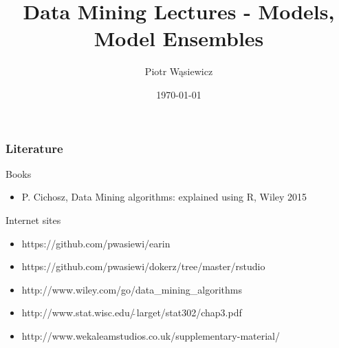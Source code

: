 \documentclass[proffesionalfonts]{beamer}
\title[EARIN]{Data Mining Lectures - Models, Model Ensembles}
\author{Piotr Wąsiewicz}
\institute[ICS PW]
{
Institute of Computer Science\\
\medskip
{\emph{pwasiewi@elka.pw.edu.pl}}
}
\date{\today}
\begin{document}

\lstset{frameround=trbl}
\lstset{commentstyle=\textit, stringstyle=\upshape,showspaces=false}

\begin{frame}
\titlepage
\end{frame}

\begin{frame}
\frametitle{Literature}
\begin{block}{Books}
\begin{itemize}
\item P. Cichosz, Data Mining algorithms: explained using R, Wiley 2015
\end{itemize}
\end{block}
\begin{block}{Internet sites}
\begin{itemize}
\item https://github.com/pwasiewi/earin
\item https://github.com/pwasiewi/dokerz/tree/master/rstudio
\item http://www.wiley.com/go/data\_mining\_algorithms
\item http://www.stat.wisc.edu/$\tilde{\ }$larget/stat302/chap3.pdf
\item http://www.wekaleamstudios.co.uk/supplementary-material/
\end{itemize}
\end{block}
\end{frame}
\end{document}

